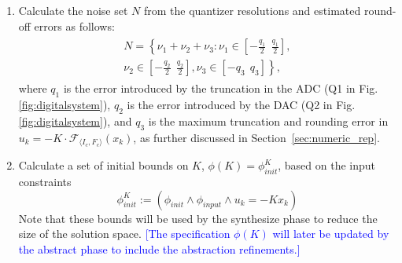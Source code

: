\documentclass[twocolumn]{autart}    %
\newcommand{\mat}[1]{{#1}}
\newcommand{\reply}[1]{\textcolor{blue}{[#1]}}
\begin{document}
\begin{enumerate}
\begin{enumerate}



\item Calculate the noise set $N$ from the quantizer resolutions and estimated round-off errors as follows: 
\begin{align*}
\nonumber
\begin{split}
N=\left \{ \nu_1+\nu_2+ \nu_3: \nu_1 \in \left[-\frac{q_1}{2}\ \ \frac{q_1}{2}\right] , \right. \\ \left. \nu_2 \in \left[-\frac{q_2}{2}\ \ \frac{q_2}{2}\right],  \nu_3 \in \left[-q_3\ \ q_3\right]  \right \}, 
\end{split}
\end{align*}
%
where  $q_1$ is the error introduced by the truncation in the ADC (Q1 in Fig. \ref{fig:digitalsystem}), 
$q_2$ is the error introduced by the DAC (Q2 in Fig. \ref{fig:digitalsystem}), 
and $q_3$ is the maximum truncation and rounding error in $u_k=-K \cdot \mathcal{F}_{\langle I_c,F_c \rangle}(x_k)$, 
as further discussed in Section~\ref{sec:numeric_rep}. %

\item Calculate a set of initial bounds on $K$, $\phi(K)=\phi_\mathit{init}^{K}$,
based on the input constraints %
%
$$\phi_\mathit{init}^{K} := (\phi_\mathit{init} \wedge \phi_\mathit{input} \wedge u_k=-K x_k)
$$
Note that these bounds will be used by the {\sc synthesize} phase to reduce the size of the solution space.
\reply{The specification $\phi(K)$ will later be updated by the  {\sc abstract} phase to include the abstraction refinements.}


\end{enumerate}
\end{enumerate}
\end{document}
